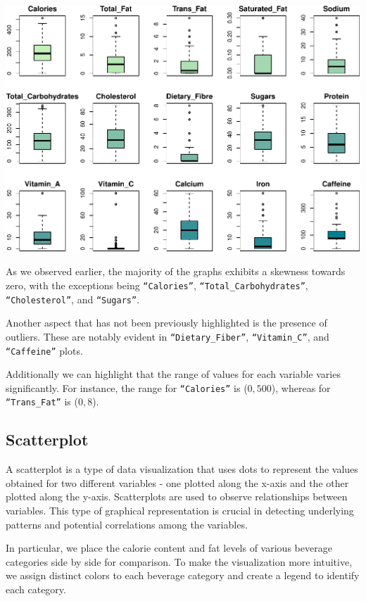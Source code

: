 \documentclass[
]{article}
\begin{document}
\begin{center}\includegraphics{Statistical_Learning_Final_Report_files/figure-latex/boxplot-1} \end{center}

As we observed earlier, the majority of the graphs exhibits a skewness
towards zero, with the exceptions being \texttt{“Calories”},
\texttt{“Total\_Carbohydrates”}, \texttt{“Cholesterol”}, and
\texttt{“Sugars”}.

Another aspect that has not been previously highlighted is the presence
of outliers. These are notably evident in \texttt{“Dietary\_Fiber”},
\texttt{“Vitamin\_C”}, and \texttt{“Caffeine”} plots.

Additionally we can highlight that the range of values for each variable
varies significantly. For instance, the range for \texttt{“Calories”} is
(\(0,500\)), whereas for \texttt{“Trans\_Fat”} is (\(0,8\)).

\subsection{Scatterplot}\label{scatterplot}

A scatterplot is a type of data visualization that uses dots to
represent the values obtained for two different variables - one plotted
along the x-axis and the other plotted along the y-axis. Scatterplots
are used to observe relationships between variables. This type of
graphical representation is crucial in detecting underlying patterns and
potential correlations among the variables.

In particular, we place the calorie content and fat levels of various
beverage categories side by side for comparison. To make the
visualization more intuitive, we assign distinct colors to each beverage
category and create a legend to identify each category.
\end{document}

